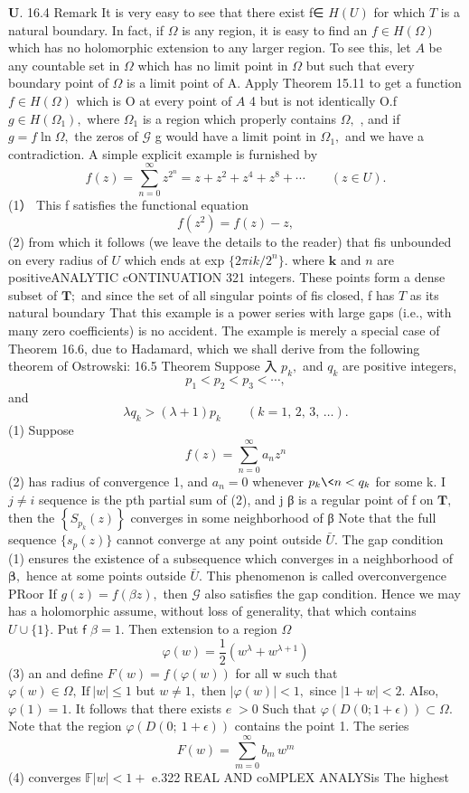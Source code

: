 ${\boldsymbol{U}}.$ 16.4 Remark It is very easy to see that there exist f∈ $H(U)$ for which ${\mathbf{}}T$ is a natural boundary. In fact, if $\Omega$ is any region, it is easy to find an $f\in H(\Omega)$ which has no holomorphic extension to any larger region. To see this, let $\scriptstyle A$ be any countable set in $\Omega$ which has no limit point in $\Omega$ but such that every boundary point of $\Omega$ is a limit point of A. Apply Theorem 15.11 to get a function $f\in H(\Omega)$ which is O at every point of $\scriptstyle A$ 4 but is not identically O.f $g\in H(\Omega_{1}),$ where $\Omega_{1}$ is a region which properly contains $\Omega,$ , and if $g=f\ln\Omega,$ the zeros of $\scriptstyle{\mathcal{G}}$ g would have a limit point in $\Omega_{1},$ and we have a contradiction. A simple explicit example is furnished by $$ f(z)=\sum_{n=0}^{\infty}z^{2^{n}}=z+z^{2}+z^{4}+z^{8}+\cdots\qquad(z\in U). $$ (1） This f satisfies the functional equation $$ f(z^{2})=f(z)-z, $$ (2) from which it follows (we leave the details to the reader) that fis unbounded on every radius of $U$ which ends at exp $\{2\pi i k/2^{n}\}.$ where $\boldsymbol{k}$ and $\scriptstyle n$ are positiveANALYTIC cONTINUATION 321 integers. These points form a dense subset of ${\boldsymbol{T}}{\boldsymbol{;}}$ and since the set of all singular points of fis closed, f has ${\mathbf{}}T$ as its natural boundary That this example is a power series with large gaps (i.e., with many zero coefficients) is no accident. The example is merely a special case of Theorem 16.6, due to Hadamard, which we shall derive from the following theorem of Ostrowski: 16.5 Theorem Suppose 入 $p_{k},$ and $q_{k}$ are positive integers, $$ p_{1}<p_{2}<p_{3}<\cdots, $$ and $$ \lambda q_{k}>(\lambda+1)p_{k}\qquad(k=1,\,2,\,3,\,\ldots). $$ (1) Suppose $$ f(z)=\sum_{n=0}^{\infty}a_{n}z^{n} $$ (2) has radius of convergence 1, and $a_{n}=0$ whenever $p_{k}\<n<q_{k}$ for some k. I $\scriptstyle{j\neq i}$ sequence is the pth partial sum of (2), and j β is a regular point of f on ${\boldsymbol{T}},$ then the $\left\{S_{p_{k}}(z)\right\}$ converges in some neighborhood of β Note that the full sequence $\{s_{p}(z)\}$ cannot converge at any point outside ${\bar{U}}.$ The gap condition (1) ensures the existence of a subsequence which converges in a neighborhood of ${\boldsymbol{\beta}},$ hence at some points outside ${\bar{U}}.$ This phenomenon is called overconvergence PRoor If $g(z)=f(\beta z),$ then $\scriptstyle{\mathcal{G}}$ also satisfies the gap condition. Hence we may has a holomorphic assume, without loss of generality, that which contains $U\cup\{1\}.$ Put $\boldsymbol{\mathsf{f}}$ $\beta=1.$ Then extension to a region $\Omega$ $$ \varphi(w)={\textstyle{\frac{1}{2}}}(w^{\lambda}+w^{\lambda+1}) $$ (3) an and define $F(w)=f(\varphi(w))$ for all w such that $\varphi(w)\in\Omega,{\mathrm{~If~}}|w|\leq1$ but $w\neq1,$ then $|\varphi(w)|<1,$ since $|1+w|<2.$ AIso, $\varphi(1)=1.$ It follows that there exists $\scriptstyle e\;>0$ Such that $\varphi(D(0;1+\epsilon))\subset\Omega.$ Note that the region $\varphi(D(0;\ 1+\epsilon))$ contains the point 1. The series $$ F(w)=\sum_{m=0}^{\infty}b_{m}\,w^{m} $$ (4) converges $\mathbb{F}\left|w\right|<1+$ e.322 REAL AND coMPLEX ANALYSis The highest 